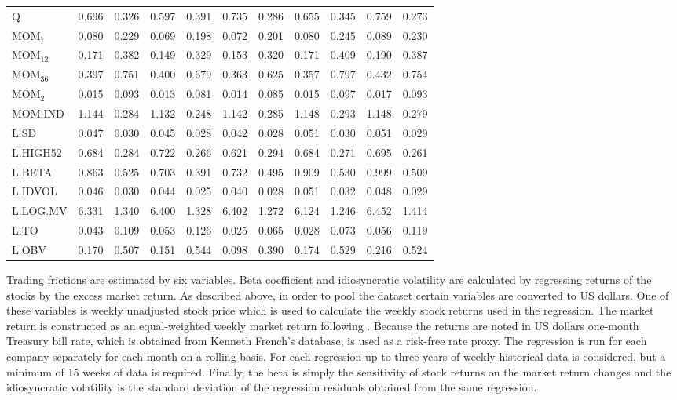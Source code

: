 \documentclass[12pt]{article}
\begin{document}
\begin{table}[ht]
\begin{tabularx}{\textwidth}{@{\extracolsep{1pt}} X r r r r r r r r r r}
Q			& 0.696 	& 0.326	& 0.597 	& 0.391	& 0.735	& 0.286	& 0.655	& 0.345	& 0.759 	& 0.273 \\
MOM$_{7}$ 	& 0.080 	& 0.229	& 0.069 	& 0.198	& 0.072	& 0.201	& 0.080	& 0.245	& 0.089	& 0.230 \\
MOM$_{12}$ 	& 0.171	& 0.382	& 0.149 	& 0.329	& 0.153	& 0.320	& 0.171	& 0.409	& 0.190	& 0.387 \\
MOM$_{36}$ 	& 0.397	& 0.751	& 0.400 	& 0.679	& 0.363	& 0.625	& 0.357	& 0.797	& 0.432	& 0.754 \\
MOM$_{2}$ 	& 0.015 	& 0.093	& 0.013 	& 0.081	& 0.014	& 0.085	& 0.015	& 0.097	& 0.017	& 0.093 \\ 
MOM.IND 	& 1.144 	& 0.284	& 1.132 	& 0.248	& 1.142	& 0.285	& 1.148	& 0.293	& 1.148	& 0.279 \\
L.SD	 		& 0.047	& 0.030	& 0.045 	& 0.028	& 0.042	& 0.028	& 0.051	& 0.030	& 0.051	& 0.029 \\
L.HIGH52		& 0.684 	& 0.284	& 0.722 	& 0.266	& 0.621	& 0.294	& 0.684	& 0.271	& 0.695	& 0.261 \\
L.BETA	 	& 0.863 	& 0.525	& 0.703 	& 0.391	& 0.732	& 0.495	& 0.909	& 0.530	& 0.999	& 0.509 \\
L.IDVOL	 	& 0.046 	& 0.030	& 0.044 	& 0.025	& 0.040	& 0.028	& 0.051	& 0.032	& 0.048	& 0.029 \\ 
L.LOG.MV	& 6.331  	& 1.340	& 6.400 	& 1.328	& 6.402	& 1.272	& 6.124	& 1.246	& 6.452	& 1.414 \\ 
L.TO		 	& 0.043  	& 0.109	& 0.053 	& 0.126	& 0.025	& 0.065	& 0.028	& 0.073	& 0.056	& 0.119 \\
L.OBV		& 0.170 	& 0.507	& 0.151 	& 0.544	& 0.098	& 0.390	& 0.174	& 0.529	& 0.216	& 0.524 \\ 
\bottomrule
\end{tabularx}
\end{table} 

Trading frictions are estimated by six variables. Beta coefficient and idiosyncratic volatility are calculated by regressing returns of the stocks by the excess market return. As described above, in order to pool the dataset certain variables are converted to US dollars. One of these variables is weekly unadjusted stock price which is used to calculate the weekly stock returns used in the regression. The market return is constructed as an equal-weighted weekly market return following \citet*{Green2017}. Because the returns are noted in US dollars one-month Treasury bill rate, which is obtained from Kenneth French's database\footnotemark, is used as a risk-free rate proxy. The regression is run for each company separately for each month on a rolling basis. For each regression up to three years of weekly historical data is considered, but a minimum of 15 weeks of data is required. Finally, the beta is simply the sensitivity of stock returns on the market return changes and the idiosyncratic volatility is the standard deviation of the regression residuals obtained from the same regression. \par
\end{document}
